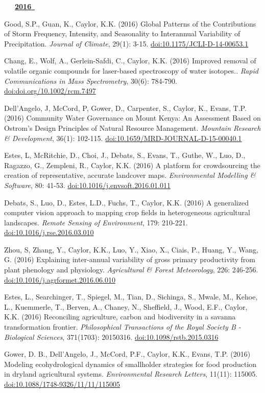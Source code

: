 \begin{etaremune}
\mbox{\ \ \ \underline{\textbf{2016 }}}

\item Good, S.P., Guan, K., Caylor, K.K. (2016) Global Patterns of the Contributions of Storm Frequency, Intensity, and Seasonality to Interannual Variability of Precipitation. \emph{Journal of Climate}, 29(1): 3-15. \href{https://doi.org/10.1175/JCLI-D-14-00653.1}{doi:10.1175/JCLI-D-14-00653.1}
\item Chang, E., Wolf, A., Gerlein-Safdi, C., Caylor, K.K. (2016) Improved removal of volatile organic compounds for laser-based spectroscopy of water isotopes.. \emph{Rapid Communications in Mass Spectrometry}, 30(6): 784-790. \href{https://doi.org/doi.org/10.1002/rcm.7497}{doi:doi.org/10.1002/rcm.7497}
\item Dell'Angelo, J, McCord, P, Gower, D., Carpenter, S., Caylor, K., Evans, T.P. (2016) Community Water Governance on Mount Kenya: An Assessment Based on Ostrom's Design Principles of Natural Resource Management. \emph{Mountain Research \& Development}, 36(1): 102-115. \href{https://doi.org/10.1659/MRD-JOURNAL-D-15-00040.1}{doi:10.1659/MRD-JOURNAL-D-15-00040.1}
\item Estes, L, McRitchie, D., Choi, J., Debats, S., Evans, T., Guthe, W., Luo, D., Ragazzo, G., Zempleni, R., Caylor, K.K. (2016) A platform for crowdsourcing the creation of representative, accurate landcover maps. \emph{Environmental Modelling \& Software}, 80: 41-53. \href{https://doi.org/10.1016/j.envsoft.2016.01.011}{doi:10.1016/j.envsoft.2016.01.011}
\item Debats, S., Luo, D., Estes, L.D., Fuchs, T., Caylor, K.K. (2016) A generalized computer vision approach to mapping crop fields in heterogeneous agricultural landscapes. \emph{Remote Sensing of Environment}, 179: 210-221. \href{https://doi.org/10.1016/j.rse.2016.03.010}{doi:10.1016/j.rse.2016.03.010}
\item Zhou, S, Zhang, Y., Caylor, K.K., Luo, Y., Xiao, X., Ciais, P., Huang, Y., Wang, G. (2016) Explaining inter-annual variability of gross primary productivity from plant phenology and physiology. \emph{Agricultural \& Forest Meteorology}, 226: 246-256. \href{https://doi.org/10.1016/j.agrformet.2016.06.010}{doi:10.1016/j.agrformet.2016.06.010}
\item Estes, L., Searchinger, T., Spiegel, M., Tian, D., Sichinga, S., Mwale, M., Kehoe, L., Kuemmerle, T., Berven, A., Chaney, N., Sheffield, J., Wood, E.F., Caylor, K.K. (2016) Reconciling agriculture, carbon and biodiversity in a savanna transformation frontier. \emph{Philosophical Transactions of the Royal Society B - Biological Sciences}, 371(1703): 20150316. \href{https://doi.org/10.1098/rstb.2015.0316}{doi:10.1098/rstb.2015.0316}
\item Gower, D. B., Dell'Angelo, J., McCord, P.F., Caylor, K.K., Evans, T.P. (2016) Modeling ecohydrological dynamics of smallholder strategies for food production in dryland agricultural systems. \emph{Environmental Research Letters}, 11(11): 115005. \href{https://doi.org/10.1088/1748-9326/11/11/115005}{doi:10.1088/1748-9326/11/11/115005}


\end{etaremune}
